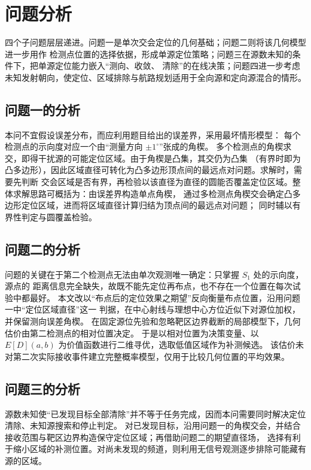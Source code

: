 \section{问题分析}

四个子问题层层递进。问题一是单次交会定位的几何基础；问题二则将该几何模型进一步用作
检测点位置的选择依据，形成单源定位策略；问题三在源数未知的条件下，把单源定位能力嵌入“测向、收敛、
清除”的在线决策；问题四进一步考虑未知发射朝向，使定位、区域排除与航路规划适用于全向源和定向源混合的情形。

\subsection{问题一的分析}
本问不宜假设误差分布，而应利用题目给出的误差界，采用最坏情形模型：
每个检测点的示向度对应一个由“测量方向 \(\pm 1^\circ\)”张成的角楔。
多个检测点的角楔求交，即得干扰源的可能定位区域。由于角楔是凸集，其交仍为凸集
（有界时即为凸多边形），因此区域直径可转化为凸多边形顶点间的最远点对问题。求解时，需要先判断
交会区域是否有界，再检验以该直径为直径的圆能否覆盖定位区域。整体求解思路可概括为：由误差界构造单点角楔，
通过多检测点角楔交会确定凸多边形定位区域，进而将区域直径计算归结为顶点间的最远点对问题；
同时辅以有界性判定与圆覆盖检验。

\subsection{问题二的分析}
问题的关键在于第二个检测点无法由单次观测唯一确定：只掌握 $S_1$ 处的示向度，源点的
距离信息完全缺失，故既不能先定位再布点，也不存在一个位置在每次试验中都最好。
本文改以“布点后的定位效果之期望”反向衡量布点位置，沿用问题一中“定位区域直径”这一
判据，在中心射线与理想中心方位近似下对源位加权，并保留测向误差角楔。
在固定源位先验和忽略靶区边界截断的局部模型下，几何估价由第二检测点的相对位置决定。
于是以相对位置为决策变量、以 $E[D](a,b)$ 为价值函数进行二维寻优，选取低值区域作为补测候选。
该估价未对第二次实际接收事件建立完整概率模型，仅用于比较几何位置的平均效果。

\subsection{问题三的分析}

源数未知使“已发现目标全部清除”并不等于任务完成，因而本问需要同时解决定位清除、未知源搜索和停止判定。
对已发现目标，沿用问题一的角楔交会，并结合接收范围与靶区边界构造保守定位区域；再借助问题二的期望直径场，
选择有利于缩小区域的补测位置。对尚未发现的频道，则利用无信号观测逐步排除可能藏有源的区域。

